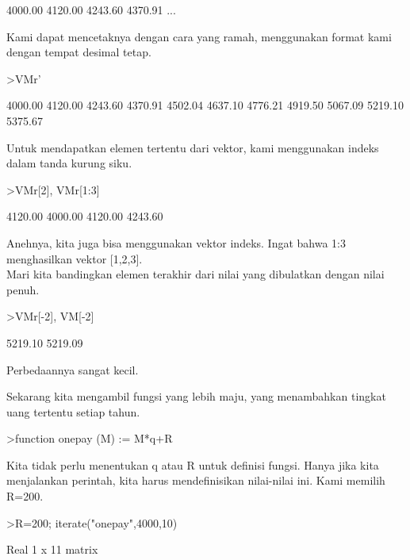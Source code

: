 \documentclass[a4paper,10pt]{article}
\begin{document}
\begin{eulernotebook}
\begin{eulercomment}
\begin{eulercomment}
\begin{eulercomment}
\begin{eulercomment}
\begin{eulercomment}
\begin{eulercomment}
\begin{euleroutput}
      4000.00     4120.00     4243.60     4370.91     ...
\end{euleroutput}
\begin{eulercomment}
Kami dapat mencetaknya dengan cara yang ramah, menggunakan format kami
dengan tempat desimal tetap.
\end{eulercomment}
\begin{eulerprompt}
>VMr'
\end{eulerprompt}
\begin{euleroutput}
      4000.00 
      4120.00 
      4243.60 
      4370.91 
      4502.04 
      4637.10 
      4776.21 
      4919.50 
      5067.09 
      5219.10 
      5375.67 
\end{euleroutput}
\begin{eulercomment}
Untuk mendapatkan elemen tertentu dari vektor, kami menggunakan indeks
dalam tanda kurung siku.
\end{eulercomment}
\begin{eulerprompt}
>VMr[2], VMr[1:3]
\end{eulerprompt}
\begin{euleroutput}
      4120.00 
      4000.00     4120.00     4243.60 
\end{euleroutput}
\begin{eulercomment}
Anehnya, kita juga bisa menggunakan vektor indeks. Ingat bahwa 1:3
menghasilkan vektor [1,2,3].\\
Mari kita bandingkan elemen terakhir dari nilai yang dibulatkan dengan
nilai penuh.
\end{eulercomment}
\begin{eulerprompt}
>VMr[-2], VM[-2]
\end{eulerprompt}
\begin{euleroutput}
      5219.10 
      5219.09 
\end{euleroutput}
\begin{eulercomment}
Perbedaannya sangat kecil.

\end{eulercomment}
\begin{eulercomment}
Sekarang kita mengambil fungsi yang lebih maju, yang menambahkan
tingkat uang tertentu setiap tahun.
\end{eulercomment}
\begin{eulerprompt}
>function onepay (M) := M*q+R
\end{eulerprompt}
\begin{eulercomment}
Kita tidak perlu menentukan q atau R untuk definisi fungsi. Hanya jika
kita menjalankan perintah, kita harus mendefinisikan nilai-nilai ini.
Kami memilih R=200.
\end{eulercomment}
\begin{eulerprompt}
>R=200; iterate("onepay",4000,10)
\end{eulerprompt}
\begin{euleroutput}
  Real 1 x 11 matrix
  

\end{euleroutput}
\end{eulercomment}
\end{eulercomment}
\end{eulercomment}
\end{eulercomment}
\end{eulercomment}
\end{eulercomment}
\end{eulernotebook}
\end{document}
